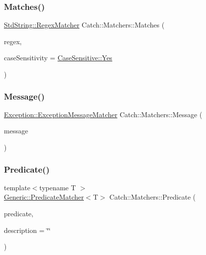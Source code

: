 \subsubsection{\texorpdfstring{Matches()}{Matches()}}
{\footnotesize\ttfamily \mbox{\hyperlink{struct_catch_1_1_matchers_1_1_std_string_1_1_regex_matcher}{Std\+String\+::\+Regex\+Matcher}} Catch\+::\+Matchers\+::\+Matches (\begin{DoxyParamCaption}\item[{std\+::string const \&}]{regex,  }\item[{\mbox{\hyperlink{struct_catch_1_1_case_sensitive_aad49d3aee2d97066642fffa919685c6a}{Case\+Sensitive\+::\+Choice}}}]{case\+Sensitivity = {\ttfamily \mbox{\hyperlink{struct_catch_1_1_case_sensitive_aad49d3aee2d97066642fffa919685c6aa7c5550b69ec3c502e6f609b67f9613c6}{Case\+Sensitive\+::\+Yes}}} }\end{DoxyParamCaption})}

\mbox{\label{namespace_catch_1_1_matchers_a0fcd8bd126bb510a6bb99e6360aa270a}} 
\subsubsection{\texorpdfstring{Message()}{Message()}}
{\footnotesize\ttfamily \mbox{\hyperlink{class_catch_1_1_matchers_1_1_exception_1_1_exception_message_matcher}{Exception\+::\+Exception\+Message\+Matcher}} Catch\+::\+Matchers\+::\+Message (\begin{DoxyParamCaption}\item[{std\+::string const \&}]{message }\end{DoxyParamCaption})}

\mbox{\label{namespace_catch_1_1_matchers_a034f2de6c0aac6f4a662fdf2558aedce}} 
\subsubsection{\texorpdfstring{Predicate()}{Predicate()}}
{\footnotesize\ttfamily template$<$typename T $>$ \\
\mbox{\hyperlink{class_catch_1_1_matchers_1_1_generic_1_1_predicate_matcher}{Generic\+::\+Predicate\+Matcher}}$<$T$>$ Catch\+::\+Matchers\+::\+Predicate (\begin{DoxyParamCaption}\item[{std\+::function$<$ bool(T const \&)$>$ const \&}]{predicate,  }\item[{std\+::string const \&}]{description = {\ttfamily \char`\"{}\char`\"{}} }\end{DoxyParamCaption})}

